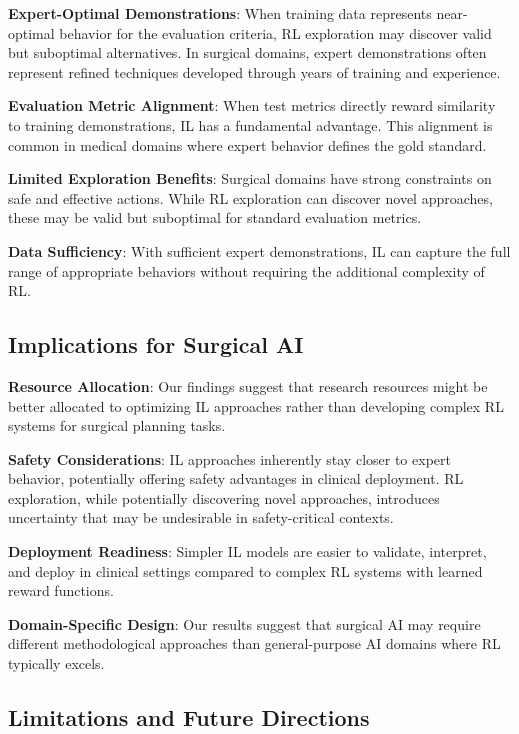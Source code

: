 \documentclass[runningheads]{llncs}
\begin{document}
\textbf{Expert-Optimal Demonstrations}: When training data represents near-optimal behavior for the evaluation criteria, RL exploration may discover valid but suboptimal alternatives. In surgical domains, expert demonstrations often represent refined techniques developed through years of training and experience.

\textbf{Evaluation Metric Alignment}: When test metrics directly reward similarity to training demonstrations, IL has a fundamental advantage. This alignment is common in medical domains where expert behavior defines the gold standard.

\textbf{Limited Exploration Benefits}: Surgical domains have strong constraints on safe and effective actions. While RL exploration can discover novel approaches, these may be valid but suboptimal for standard evaluation metrics.

\textbf{Data Sufficiency}: With sufficient expert demonstrations, IL can capture the full range of appropriate behaviors without requiring the additional complexity of RL.

\subsection{Implications for Surgical AI}

\textbf{Resource Allocation}: Our findings suggest that research resources might be better allocated to optimizing IL approaches rather than developing complex RL systems for surgical planning tasks.

\textbf{Safety Considerations}: IL approaches inherently stay closer to expert behavior, potentially offering safety advantages in clinical deployment. RL exploration, while potentially discovering novel approaches, introduces uncertainty that may be undesirable in safety-critical contexts.

\textbf{Deployment Readiness}: Simpler IL models are easier to validate, interpret, and deploy in clinical settings compared to complex RL systems with learned reward functions.

\textbf{Domain-Specific Design}: Our results suggest that surgical AI may require different methodological approaches than general-purpose AI domains where RL typically excels.

\subsection{Limitations and Future Directions}
\end{document}
